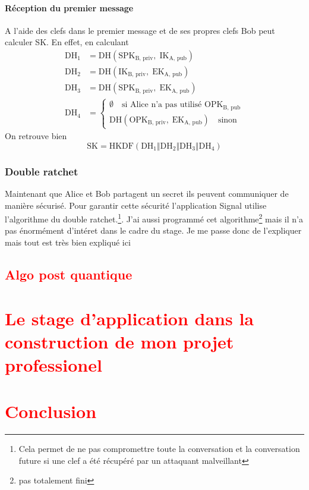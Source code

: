 \documentclass[a4paper, 12pt]{article}
\begin{document}
\paragraph{Réception du premier message}
A l'aide des clefs dans le premier message et de ses propres clefs Bob peut calculer SK. En effet, en calculant 
\begin{align*}
	\text{DH}_1 &= \hyperref[DH]{\text{DH}}\left(\text{SPK}_{\text{B, priv}}, \;\text{IK}_{\text{A, pub}}\right)\\
	\text{DH}_2 &= \hyperref[DH]{\text{DH}}\left(\text{IK}_{\text{B, priv}}, \;\text{EK}_{\text{A, pub}}\right)\\
	\text{DH}_3 &= \hyperref[DH]{\text{DH}}\left(\text{SPK}_{\text{B, priv}}, \;\text{EK}_{\text{A, pub}}\right)\\
	\text{DH}_4 &= \begin{cases}\emptyset \quad\text{si Alice n'a pas utilisé $\text{OPK}_{\text{B, pub}}$}\\\hyperref[DH]{\text{DH}}\left(\text{OPK}_{\text{B, priv}}, \;\text{EK}_{\text{A, pub}}\right) \quad\text{sinon}\end{cases}
\end{align*}
On retrouve bien 
$$\text{SK} = \hyperref[HKDF]{\text{HKDF}}\left(\text{DH}_1\hyperref[concat]{\Vert}\text{DH}_2\hyperref[concat]{\Vert}\text{DH}_3\hyperref[concat]{\Vert}\text{DH}_4\right)$$


\subsubsection{Double ratchet}\label{doubleratchet}
Maintenant que Alice et Bob partagent un secret ils peuvent communiquer de manière sécurisé. Pour garantir cette sécurité l'application Signal utilise l'algorithme du double ratchet.\footnote{Cela permet de ne pas compromettre toute la conversation et la conversation future si une clef a été récupéré par un attaquant malveillant}. J'ai aussi programmé cet algorithme\footnote{pas totalement fini} mais il n'a pas énormément d'intéret dans le cadre du stage. Je me passe donc de l'expliquer mais tout est très bien expliqué ici \cite{doubleratchet}

\subsection{\textcolor{red}{Algo post quantique}}

\section{\textcolor{red}{Le stage d'application dans la construction de mon projet professionel}}
\section{\textcolor{red}{Conclusion}}





\printbibliography
\end{document}
